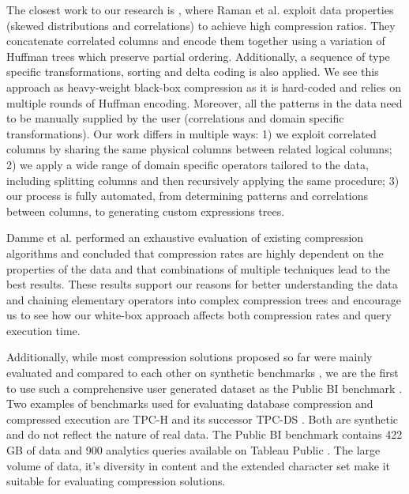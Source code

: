 The closest work to our research is \cite{raman2006wring}, where Raman et al. exploit data properties (skewed distributions and correlations) to achieve high compression ratios. They concatenate correlated columns and encode them together using a variation of Huffman trees which preserve partial ordering. Additionally, a sequence of type specific transformations, sorting and delta coding is also applied. We see this approach as heavy-weight black-box compression as it is hard-coded and relies on multiple rounds of Huffman encoding. Moreover, all the patterns in the data need to be manually supplied by the user (correlations and domain specific transformations). Our work differs in multiple ways: 1) we exploit correlated columns by sharing the same physical columns between related logical columns; 2) we apply a wide range of domain specific operators tailored to the data, including splitting columns and then recursively applying the same procedure; 3) our process is fully automated, from determining patterns and correlations between columns, to generating custom expressions trees.

Damme et al. \cite{damme2017lightweight} performed an exhaustive evaluation of existing compression algorithms and concluded that compression rates are highly dependent on the properties of the data and that combinations of multiple techniques lead to the best results. These results support our reasons for better understanding the data and chaining elementary operators into complex compression trees and encourage us to see how our white-box approach affects both compression rates and query execution time.

Additionally, while most compression solutions proposed so far were mainly evaluated and compared to each other on synthetic benchmarks \cite{abadi2006integrating,zukowski2006super,lee2014joins,lang2016data,raman2013db2}, we are the first to use such a comprehensive user generated dataset as the Public BI benchmark \cite{pbib}. Two examples of benchmarks used for evaluating database compression and compressed execution are TPC-H \cite{boncz2013tpc} and its successor TPC-DS \cite{nambiar2006making}. Both are synthetic and do not reflect the nature of real data. The Public BI benchmark contains 422 GB of data and 900 analytics queries available on Tableau Public \cite{vogelsgesang2018get, tableaupublic}. The large volume of data, it’s diversity in content and the extended character set make it suitable for evaluating compression solutions.



